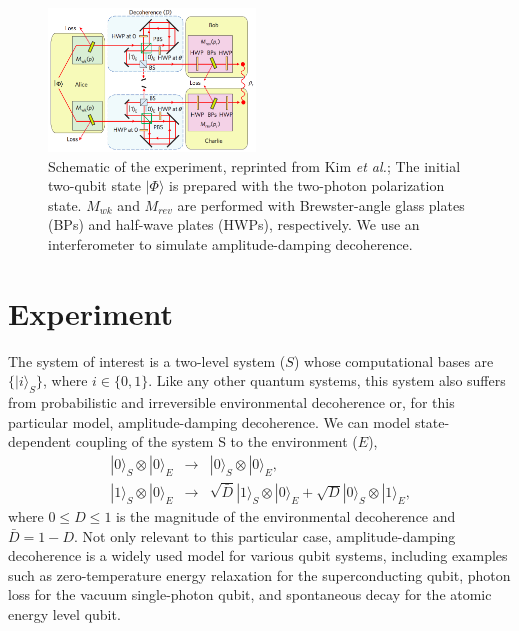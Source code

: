 \documentclass[%
 reprint,
 amsmath,amssymb,
 aps,
]{revtex4-1}
\begin{document}
\begin{figure}
        \centering
        \includegraphics[width=0.49\textwidth]{setup}
        \caption{Schematic of the experiment, reprinted from Kim \textit{et al.}; The initial two-qubit state $|\Phi\rangle$ is prepared with the two-photon polarization state. $M_{wk}$ and $M_{rev}$ are performed with Brewster-angle glass plates (BPs) and half-wave plates (HWPs), respectively. We use an interferometer to simulate amplitude-damping decoherence.}\label{fig:setup}
\end{figure}

\section{Experiment}
\noindent The system of interest is a two-level system ($S$) whose computational bases are $\{|i\rangle_S\}$, where $i \in \{0,1\}$. Like any other quantum systems, this system also suffers from probabilistic and irreversible environmental decoherence or, for this particular model, amplitude-damping decoherence. We can model state-dependent coupling of the system S to the environment ($E$),
\begin{eqnarray}
|0\rangle_S \otimes |0\rangle_E  & \rightarrow & |0\rangle_S \otimes |0\rangle_E \text{,} \\
|1\rangle_S \otimes |0\rangle_E  & \rightarrow & \sqrt{\bar{D}} |1\rangle_S \otimes |0\rangle_E + \sqrt{D} |0\rangle_S \otimes |1\rangle_E \text{,}
\end{eqnarray}
\noindent where $0 \le D \le 1$ is the magnitude of the environmental decoherence and $\bar{D}=1-D$. Not only relevant to this particular case, amplitude-damping decoherence is a widely used model for various qubit systems, including examples such as zero-temperature energy relaxation for the superconducting qubit, photon loss for the vacuum single-photon qubit, and spontaneous decay for the atomic energy level qubit.
\end{document}
